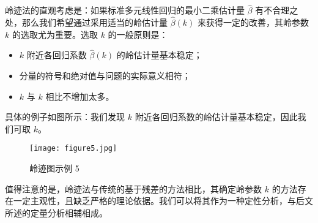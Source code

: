 \documentclass[lang=cn,11pt,a4paper]{elegantpaper}
\begin{document}
    岭迹法的直观考虑是：如果标准多元线性回归的最小二乘估计量 \(\hat{\beta}\) 有不合理之处，那么我们希望通过采用适当的岭估计量 \(\hat{\beta}(k)\) 来获得一定的改善，其岭参数 \(k\) 的选取尤为重要。选取 \(k\) 的一般原则是：
    
    \begin{itemize}
        \item \(k\) 附近各回归系数 \(\hat{\beta}(k)\) 的岭估计量基本稳定；
        \item 分量的符号和绝对值与问题的实际意义相符；
        \item \(k\) 与 \(k\) 相比不增加太多。
    \end{itemize}
    
    具体的例子如图所示：我们发现 \(k\) 附近各回归系数的岭估计量基本稳定，因此我们可取 \(k\)。
    
    \begin{figure}[h]
        \centering
        \texttt{[image: figure5.jpg]}
        \caption{岭迹图示例 5}
        \label{fig:figure5}
    \end{figure}
    
    值得注意的是，岭迹法与传统的基于残差的方法相比，其确定岭参数 \(k\) 的方法存在一定主观性，且缺乏严格的理论依据。我们可以将其作为一种定性分析，与后文所述的定量分析相辅相成。


        
\end{document}
